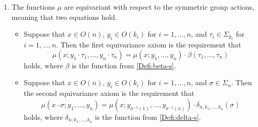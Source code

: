 \begin{Defi}
\begin{enumerate}
\item The functions $\mu$ are equivariant with respect to the symmetric group actions, meaning that two equations hold.
\begin{itemize}
\item[3.1] Suppose that $x \in O(n)$, $y_i \in O(k_i)$ for $i = 1, \ldots, n$, and $\tau_i \in \Sigma_{k_i}$ for  $i = 1, \ldots, n$. Then the first equivariance axiom is the requirement that
\[
\mu(x;y_1 \cdot \tau_1,\ldots,y_n \cdot \tau_n) = \mu(x;y_1,\ldots,y_n)\cdot \beta(\tau_1,\ldots,\tau_n)
\]
holds, where $\beta$ is the function from \cref{Defi:beta-s}.
\end{itemize}
\begin{itemize}
\item[3.2] Suppose that  $x \in O(n)$, $y_i \in O(k_i)$ for $i = 1, \ldots, n$, and $\sigma \in \Sigma_{n}$. 
Then the second equivariance axiom is the requirement that
\[
 \mu(x \cdot \sigma; y_1, \ldots, y_n) = \mu\left(x;y_{\sigma^{-1}(1)},\ldots,y_{\sigma^{-1}(n)}\right)\cdot \delta_{n; k_1, \ldots, k_n}(\sigma)
\]
holds, where $\delta_{n; k_1, \ldots, k_n}$ is the function from \cref{Defi:delta-s}.
\end{itemize}
\end{enumerate}
\end{Defi}


